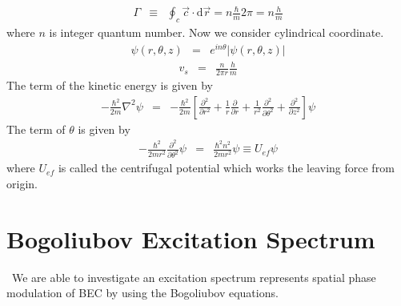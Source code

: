 \documentclass[12pt,a4paper]{report}
\newcommand{\diff}{\mathrm{d}}				            %
\begin{document}
\begin{eqnarray}
\Gamma & \equiv & \oint_c \vec{c} \cdot \diff \vec{r} = n \frac{\hbar}{m} 2 \pi = n \frac{h}{m}
\end{eqnarray}
where $n$ is integer quantum number.
Now we consider cylindrical coordinate.
\begin{eqnarray}
\psi(r, \theta, z) & = & e^{i n \theta}|\psi(r, \theta, z)|
\end{eqnarray}
\begin{eqnarray}
v_s & = & \frac{n}{2 \pi r}\frac{h}{m}
\end{eqnarray}
The term of the kinetic energy is given by
\begin{eqnarray}
- \frac{\hbar^2}{2m} \nabla^2 \psi & = & -\frac{\hbar^2}{2m}
\left[ \frac{\partial^2}{\partial r^2} + \frac{1}{r} \frac{\partial}{\partial r}
+ \frac{1}{r^2}\frac{\partial^2}{\partial \theta^2} + \frac{\partial^2}{\partial z^2} 
\right] \psi
\end{eqnarray}
The term of $\theta$ is given by
\begin{eqnarray}
-\frac{\hbar^2}{2mr^2} \frac{\partial^2}{\partial \theta^2} \psi
& = & \frac{\hbar^2 n^2}{2mr^2} \psi \equiv U_{ef} \psi
\end{eqnarray}
where $U_{ef}$ is called the centrifugal potential which works the leaving force from origin.


\section{Bogoliubov Excitation Spectrum}
\ We are able to investigate an excitation spectrum represents spatial phase modulation of BEC
by using the Bogoliubov equations.
\end{document}
